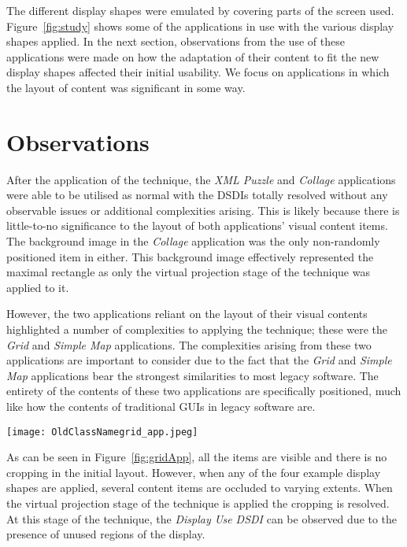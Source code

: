\documentclass[review,5p,times,twocolumn]{elsarticle}
\begin{document}
The different display shapes were emulated by covering parts of the screen used.
Figure~\ref{fig:study} shows some of the applications in use with the various display shapes applied.
In the next section, observations from the use of these applications were made on how the adaptation of their content to fit the new display shapes affected their initial usability.
We focus on applications in which the layout of content was significant in some way.

\section{Observations}
\label{sec:observations}

After the application of the technique, the {\emph{XML Puzzle}} and {\emph{Collage}} applications were able to be utilised as normal with the \acp{DSDI} totally resolved without any observable issues or additional complexities arising.
This is likely because there is little-to-no significance to the layout of both applications' visual content items.
The background image in the {\emph{Collage}} application was the only non-randomly positioned item in either.
This background image effectively represented the maximal rectangle as only the virtual projection stage of the technique was applied to it.

However, the two applications reliant on the layout of their visual
contents highlighted a number of complexities to applying the technique; these were the {\emph{Grid}} and {\emph{Simple Map}} applications.
The complexities arising from these two applications are important to consider due to the fact that the {\emph{Grid}} and {\emph{Simple Map}} applications bear the strongest similarities to most legacy software.
The entirety of the contents of these two applications are specifically positioned, much like how the contents of traditional GUIs in legacy software are.

\begin{figure*}[t!] 
	\centerline{\texttt{[image: OldClassNamegrid\_app.jpeg]}}
	\caption{Influence of the implemented technique on {\emph{SynergyNet}}'s {\emph{Grid}} application.}
	\label{fig:gridApp}
\end{figure*}

As can be seen in Figure~\ref{fig:gridApp}, all the items are visible and there is no cropping in the initial layout.
However, when any of the four example display shapes are applied, several content items are occluded to varying extents.
When the virtual projection stage of the technique is applied the cropping is resolved.
At this stage of the technique, the {\emph{Display Use \ac{DSDI}}} can be observed due to the presence of unused regions of the display.
\end{document}
